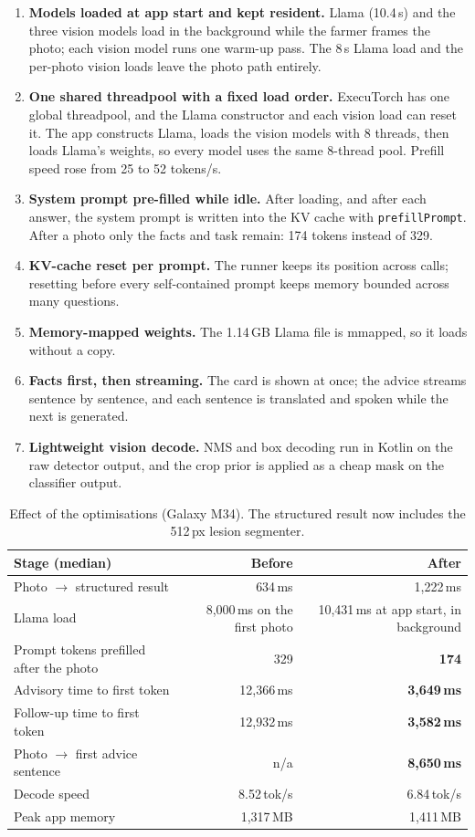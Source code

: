 \documentclass[11pt,a4paper]{article}
\begin{document}
\begin{enumerate}
\item \textbf{Models loaded at app start and kept resident.} Llama (10.4\,s) and the three vision models load in the
background while the farmer frames the photo; each vision model runs one warm-up pass. The 8\,s Llama load and the
per-photo vision loads leave the photo path entirely.
\item \textbf{One shared threadpool with a fixed load order.} ExecuTorch has one global threadpool, and the Llama
constructor and each vision load can reset it. The app constructs Llama, loads the vision models with 8 threads, then
loads Llama's weights, so every model uses the same 8-thread pool. Prefill speed rose from 25 to 52 tokens/s.
\item \textbf{System prompt pre-filled while idle.} After loading, and after each answer, the system prompt is written
into the KV cache with \texttt{prefillPrompt}. After a photo only the facts and task remain: 174 tokens instead of
329.
\item \textbf{KV-cache reset per prompt.} The runner keeps its position across calls; resetting before every
self-contained prompt keeps memory bounded across many questions.
\item \textbf{Memory-mapped weights.} The 1.14\,GB Llama file is mmapped, so it loads without a copy.
\item \textbf{Facts first, then streaming.} The card is shown at once; the advice streams sentence by sentence, and
each sentence is translated and spoken while the next is generated.
\item \textbf{Lightweight vision decode.} NMS and box decoding run in Kotlin on the raw detector output, and the crop
prior is applied as a cheap mask on the classifier output.
\end{enumerate}

\begin{table}[h]
\centering\small
\begin{tabular}{@{}lrr@{}}
\toprule
\textbf{Stage (median)} & \textbf{Before} & \textbf{After} \\
\midrule
Photo $\rightarrow$ structured result & 634\,ms & 1,222\,ms \\
Llama load & 8,000\,ms on the first photo & 10,431\,ms at app start, in background \\
Prompt tokens prefilled after the photo & 329 & \textbf{174} \\
Advisory time to first token & 12,366\,ms & \textbf{3,649\,ms} \\
Follow-up time to first token & 12,932\,ms & \textbf{3,582\,ms} \\
Photo $\rightarrow$ first advice sentence & n/a & \textbf{8,650\,ms} \\
Decode speed & 8.52\,tok/s & 6.84\,tok/s \\
Peak app memory & 1,317\,MB & 1,411\,MB \\
\bottomrule
\end{tabular}
\caption{Effect of the optimisations (Galaxy M34). The structured result now includes the 512\,px lesion segmenter.}
\end{table}
\end{document}
